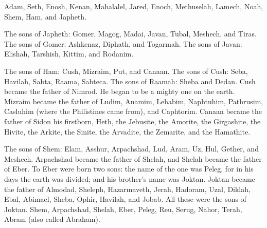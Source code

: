 
\newpage
\null
\thispagestyle{empty}
\newpage









\vspace{-1.36in}

\mychapter{} \myverse*{}Adam, Seth, Enosh,
\myverse{}Kenan, Mahalalel, Jared,
\myverse{}Enoch, Methuselah, Lamech,
\myverse{}Noah, Shem, Ham, and Japheth.

\myverse{}The sons of Japheth: Gomer, Magog, Madai, Javan, Tubal, Meshech,
and Tiras.
\myverse{}The sons of Gomer: Ashkenaz, Diphath, and Togarmah.
\myverse{}The sons of Javan: Elishah, Tarshish, Kittim, and Rodanim.

\myverse{}The sons of Ham: Cush, Mizraim, Put, and Canaan.
\myverse{}The sons of Cush: Seba, Havilah, Sabta, Raama, Sabteca. The sons of Raamah:
Sheba and Dedan.
\myverse{}Cush became the father of Nimrod. He began to be a mighty one on the earth.
\myverse{}Mizraim became the father of Ludim, Anamim, Lehabim, Naphtuhim,
\myverse{}Pathrusim, Casluhim (where the Philistines came from), and Caphtorim.
\myverse{}Canaan became the father of Sidon his firstborn, Heth,
\myverse{}the Jebusite, the Amorite, the Girgashite,
\myverse{}the Hivite, the Arkite, the Sinite,
\myverse{}the Arvadite, the Zemarite, and the Hamathite.

\myverse{}The sons of Shem: Elam, Asshur, Arpachshad, Lud, Aram, Uz, Hul,
Gether, and Meshech.
\myverse{}Arpachshad became the father of Shelah, and Shelah became the father of Eber.
\myverse{}To Eber were born two sons: the name of the one was Peleg, for in his days
the earth was divided; and his brother’s name was Joktan.
\myverse{}Joktan became the father of Almodad, Sheleph, Hazarmaveth, Jerah,
\myverse{}Hadoram, Uzal, Diklah,
\myverse{}Ebal, Abimael, Sheba,
\myverse{}Ophir, Havilah, and Jobab. All these were the sons of Joktan.
\myverse{}Shem, Arpachshad, Shelah,
\myverse{}Eber, Peleg, Reu,
\myverse{}Serug, Nahor, Terah,
\myverse{}Abram (also called Abraham).

